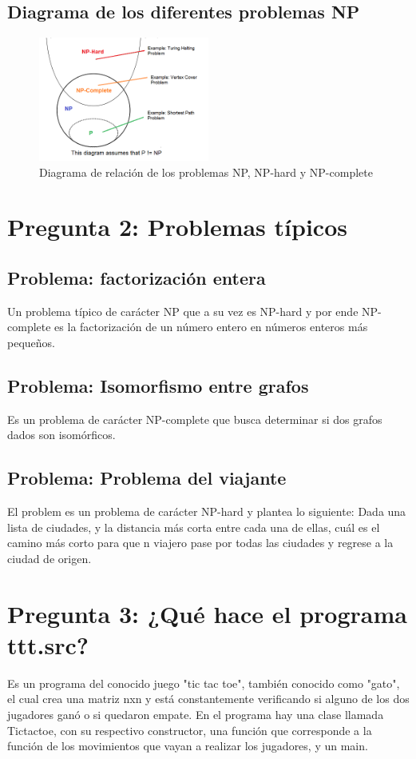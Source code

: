 \documentclass[11pt]{article}
\begin{document}
\subsection{Diagrama de los diferentes problemas NP}

\begin{figure}[!ht]
	\caption{Diagrama de relación de los problemas NP, NP-hard y NP-complete}
	\centering
	\includegraphics[width=0.5\textwidth]{1}
\end{figure}

\section{Pregunta 2: Problemas típicos}
\subsection{Problema: factorización entera}
Un problema típico de carácter NP que a su vez es NP-hard y por ende NP-complete es la factorización de un número entero en números enteros más pequeños.
\subsection{Problema: Isomorfismo entre grafos}
Es un problema de carácter NP-complete que busca determinar si dos grafos dados son isomórficos.
\subsection{Problema: Problema del viajante}
El problem es un problema de carácter NP-hard y plantea lo siguiente: Dada una lista de ciudades, y la distancia más corta entre cada una de ellas, cuál es el camino más corto para que n viajero pase por todas las ciudades y regrese a la ciudad de origen.

\section{Pregunta 3: ¿Qué hace el programa ttt.src?}
Es un programa del conocido juego "tic tac toe", también conocido como "gato", el cual crea una matriz nxn y está constantemente verificando si alguno de los dos jugadores ganó o si quedaron empate. En el programa hay una clase llamada Tictactoe, con su respectivo constructor, una función que corresponde a la función de los movimientos que vayan a realizar los jugadores, y un main.
\end{document}

